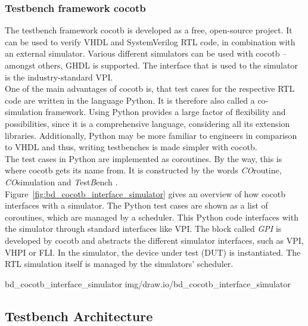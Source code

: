 \subsubsection{Testbench framework cocotb}
\label{sub:VHDL:FrameworkCocotb}

The testbench framework cocotb is developed as a free, open-source project.
It can be used to verify VHDL and SystemVerilog RTL code, in combination with an external simulator.
Various different simulators can be used with cocotb -- amongst others, GHDL is supported.
The interface that is used to the simulator is the industry-standard VPI.\\

One of the main advantages of cocotb is, that test cases for the respective RTL code are written in the language Python.
It is therefore also called a co-simulation framework.
Using Python provides a large factor of flexibility and possibilities, since it is a comprehensive language, considering all its extension libraries.
Additionally, Python may be more familiar to engineers in comparison to VHDL and thus, writing testbenches is made simpler with cocotb.\\

The test cases in Python are implemented as coroutines.
By the way, this is where cocotb gets its name from.
It is constructed by the words \textit{CO}routine, \textit{CO}simulation and \textit{T}est\textit{B}ench \cite{cocotbDoc}.\\

Figure~\ref{fig:bd_cocotb_interface_simulator} gives an overview of how cocotb interfaces with a simulator.
The Python test cases are shown as a list of coroutines, which are managed by a scheduler.
This Python code interfaces with the simulator through standard interfaces like VPI.
The block called \textit{GPI} is developed by cocotb and abstracts the different simulator interfaces, such as VPI, VHPI or FLI.
In the simulator, the device under test (DUT) is instantiated.
The RTL simulation itself is managed by the simulators' scheduler.

 {bd_cocotb_interface_simulator} {img/draw.io/bd_cocotb_interface_simulator}

\subsection{Testbench Architecture}
\label{sub:VHDL:TestbenchArchitecture}


